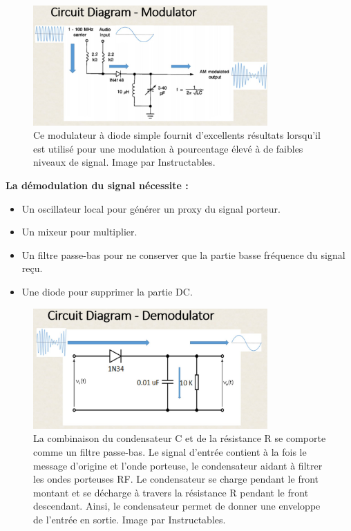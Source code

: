 \begin{figure}[H] %
    \centering
    \includegraphics[width=0.8\textwidth]{figures/6-34.jpg}
    \caption{Ce modulateur à diode simple fournit d'excellents résultats lorsqu'il est utilisé pour une modulation à pourcentage élevé à de faibles niveaux de signal. Image par Instructables.}
    \label{fig:communication2}
\end{figure}
\textbf{La démodulation du signal nécessite :}
\begin{itemize}
    \item Un oscillateur local pour générer un proxy du signal porteur.
    \item Un mixeur pour multiplier.
    \item Un filtre passe-bas pour ne conserver que la partie basse fréquence du signal reçu.
    \item Une diode pour supprimer la partie DC.
\end{itemize}
\begin{figure}[H] %
    \centering
    \includegraphics[width=0.8\textwidth]{figures/6-35.jpg}
    \caption{La combinaison du condensateur C et de la résistance R se comporte comme un filtre passe-bas. Le signal d'entrée contient à la fois le message d'origine et l'onde porteuse, le condensateur aidant à filtrer les ondes porteuses RF. Le condensateur se charge pendant le front montant et se décharge à travers la résistance R pendant le front descendant. Ainsi, le condensateur permet de donner une enveloppe de l'entrée en sortie. Image par Instructables.}
    \label{fig:communication2}
\end{figure}

